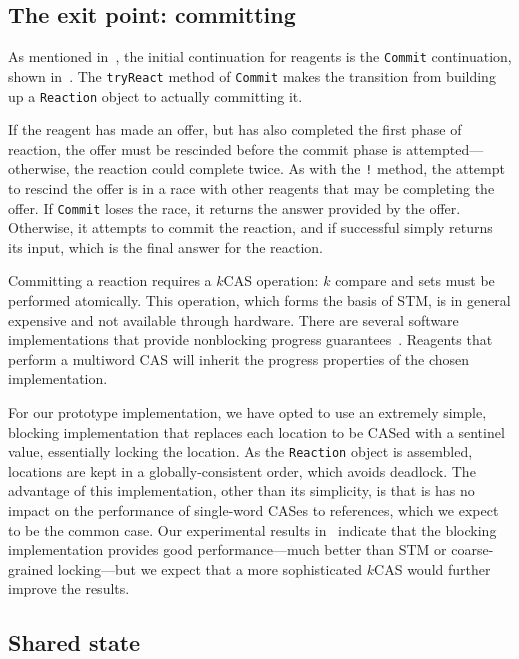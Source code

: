 \documentclass[preprint,nocopyrightspace]{sigplanconf}
\begin{document}
\subsection{The exit point: committing}
\label{sec:impl-commit}

As mentioned in~, the initial continuation for reagents is the
\lstinline{Commit} continuation, shown in~.  The
\lstinline{tryReact} method of \lstinline{Commit} makes the transition from
building up a \lstinline{Reaction} object to actually committing it.

If the reagent has made an offer, but has also completed the first phase of
reaction, the offer must be rescinded before the commit phase is
attempted---otherwise, the reaction could complete twice.  As with the
\lstinline{!} method, the attempt to rescind the offer is in a race with other
reagents that may be completing the offer.  If \lstinline{Commit} loses the
race, it returns the answer provided by the offer.  Otherwise, it attempts to
commit the reaction, and if successful simply returns its input, which is the
final answer for the reaction.

Committing a reaction requires a $k$CAS operation: $k$ compare and sets must be
performed atomically.  This operation, which forms the basis of STM, is in
general expensive and not available through hardware.  There are several
software implementations that provide nonblocking progress
guarantees~\cite{Fraser2007,Luchangco2003,Attiya2008}.  Reagents that perform a
multiword CAS will inherit the progress properties of the chosen implementation.

For our prototype implementation, we have opted to use an extremely simple,
blocking implementation that replaces each location to be CASed with a sentinel
value, essentially locking the location.  As the \lstinline{Reaction} object is
assembled, locations are kept in a globally-consistent order, which avoids
deadlock.  The advantage of this implementation, other than its simplicity, is
that is has no impact on the performance of single-word CASes to references,
which we expect to be the common case.  Our experimental results
in~ indicate that the blocking implementation provides good
performance---much better than STM or coarse-grained locking---but we expect
that a more sophisticated $k$CAS would further improve the results.

\subsection{Shared state}
\label{sec:impl-state}
\end{document}
